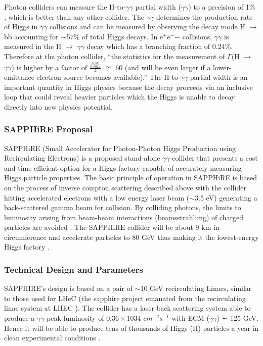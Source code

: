 Photon colliders can measure the H-to-$\gamma\gamma$ partial width ($\gamma\gamma$) to a precision of 1\% \cite{Chou:Higgs}, which is better than any other collider. The $\gamma\gamma$ determines the production rate of Higgs in $\gamma\gamma$ collisions and can be measured by observing the decay mode H $\rightarrow$ bb accounting for ∼57\% of total Higgs decays. In e$^{+}$e$^{-}$− collisions, $\gamma\gamma$ is measured in the H $\rightarrow$ $\gamma\gamma$ decay which has a branching fraction of 0.24\%. Therefore at the photon collider, ``the statistics for the measurement of $\Gamma$(H $\rightarrow$ $\gamma\gamma$) is higher by a factor of $\frac{\frac{0.57}{0.0024}}{4}$ $\simeq$ 60 (and will be even larger if a lower-emittance electron source becomes available).'' \cite{Telnov:Photons} The H-to-$\gamma\gamma$ partial width is an important quantity in Higgs physics because the decay proceeds via an inclusive loop that could reveal heavier particles which the Higgs is unable to decay directly into \textendash new physics potential.

\subsubsection{SAPPHiRE Proposal}
SAPPHiRE (Small Accelerator for Photon-Photon Higgs Production using Recirculating Electrons) is a proposed stand-alone $\gamma\gamma$ collider that presents a cost and time efficient option for a Higgs factory capable of accurately measuring Higgs particle properties. The basic principle of operation in SAPPHiRE is based on the process of inverse compton scattering described above with the collider hitting accelerated electrons with a low energy laser beam ($\sim$3.5 eV) generating a back-scattered gamma beam for collision. By colliding photons, the limits to luminosity arising from beam-beam interactions (beamsstrahlung) of charged particles are avoided \cite{Zimmermann:SAPPHiRE}. The SAPPHiRE collider will be about 9 km in circumference and accelerate particles to 80 GeV thus making it the lowest-energy Higgs factory \cite{Bogacz:SAPPHiRE}.

\subsubsection{Technical Design and Parameters}                                                                                                            SAPPHIRE's design is based on a pair of $\sim$10 GeV recirculating Linacs, similar to those used for LHeC (the sapphire project emanated from the recirculating linac system at LHEC ). The collider has a laser back scattering system able to produce a $\gamma\gamma$ peak luminosity of $0.36 \times 1034$ $cm^{−2} s^{−1}$ with ECM ($\gamma\gamma$) ∼ 125 GeV. Hence it will be able to produce tens of thousands of Higgs (H) particles a year in clean experimental conditions \cite{Bogacz:SAPPHiRE}.


